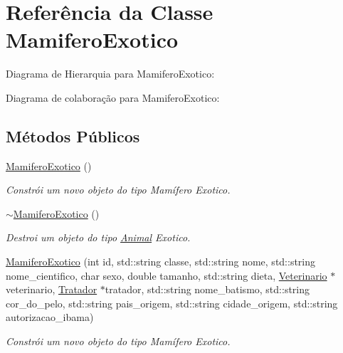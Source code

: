 \hypertarget{classMamiferoExotico}{}\section{Referência da Classe Mamifero\+Exotico}
\label{classMamiferoExotico}


Diagrama de Hierarquia para Mamifero\+Exotico\+:


Diagrama de colaboração para Mamifero\+Exotico\+:
\subsection*{Métodos Públicos}
\begin{DoxyCompactItemize}
\item 
\mbox{\label{classMamiferoExotico_a7dda2506d9e38c14b6d85fa666344ed6}} 
\hyperlink{classMamiferoExotico_a7dda2506d9e38c14b6d85fa666344ed6}{Mamifero\+Exotico} ()
\begin{DoxyCompactList}\small\item\em Constrói um novo objeto do tipo Mamífero Exotico. \end{DoxyCompactList}\item 
\mbox{\label{classMamiferoExotico_a2ab6c04adde874cc40aa55b5f586c15a}} 
\hyperlink{classMamiferoExotico_a2ab6c04adde874cc40aa55b5f586c15a}{$\sim$\+Mamifero\+Exotico} ()
\begin{DoxyCompactList}\small\item\em Destroi um objeto do tipo \hyperlink{classAnimal}{Animal} Exotico. \end{DoxyCompactList}\item 
\hyperlink{classMamiferoExotico_a79b2b19d1c2de729de2b92c173521379}{Mamifero\+Exotico} (int id, std\+::string classe, std\+::string nome, std\+::string nome\+\_\+cientifico, char sexo, double tamanho, std\+::string dieta, \hyperlink{classVeterinario}{Veterinario} $\ast$veterinario, \hyperlink{classTratador}{Tratador} $\ast$tratador, std\+::string nome\+\_\+batismo, std\+::string cor\+\_\+do\+\_\+pelo, std\+::string pais\+\_\+origem, std\+::string cidade\+\_\+origem, std\+::string autorizacao\+\_\+ibama)
\begin{DoxyCompactList}\small\item\em Constrói um novo objeto do tipo Mamífero Exotico. \end{DoxyCompactList}\item 

\end{DoxyCompactItemize}
